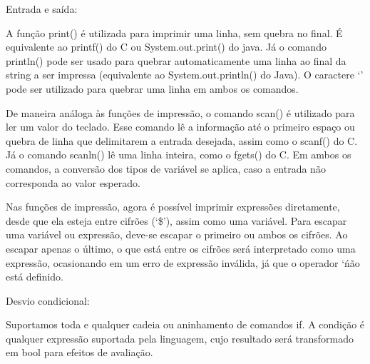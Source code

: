 \documentclass[12pt,a4paper]{article}
\begin{document}
Entrada e saída:

A função print() é utilizada para imprimir uma linha, sem quebra no final. É equivalente ao printf() do C ou System.out.print() do java. Já o comando println() pode ser usado para quebrar automaticamente uma linha ao final da string a ser impressa (equivalente ao System.out.println() do Java). O caractere `\n' pode ser utilizado para quebrar uma linha em ambos os comandos.

De maneira análoga às funções de impressão, o comando scan() é utilizado para ler um valor do teclado. Esse comando lê a informação até o primeiro espaço ou quebra de linha que delimitarem a entrada desejada, assim como o scanf() do C. Já o comando scanln() lê uma linha inteira, como o fgets() do C. Em ambos os comandos, a conversão dos tipos de variável se aplica, caso a entrada não corresponda ao valor esperado.

Nas funções de impressão, agora é possível imprimir expressões diretamente, desde que ela esteja entre cifrões (`\$'), assim como uma variável. Para escapar uma variável ou expressão, deve-se escapar o primeiro ou ambos os cifrões. Ao escapar apenas o último, o que está entre os cifrões será interpretado como uma expressão, ocasionando em um erro de expressão inválida, já que o operador `\' não está definido.


Desvio condicional:

Suportamos toda e qualquer cadeia ou aninhamento de comandos if. A condição é qualquer expressão suportada pela linguagem, cujo resultado será transformado em bool para efeitos de avaliação.
\end{document}
